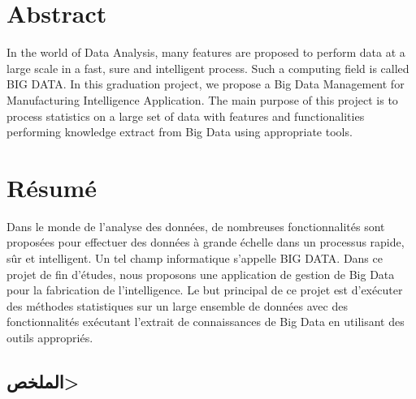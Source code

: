 \renewcommand{\abstractnamefont}{\normalfont\Large\bfseries}


\hskip7mm






\section*{Abstract}


\begin{spacing}{1.3}
In the world of Data Analysis, many features are proposed to perform data at a large scale in a fast, sure and intelligent process. Such a computing field is called BIG DATA. In this graduation project, we propose a Big Data Management for Manufacturing Intelligence Application. The main purpose of this project is to process statistics on a large set of data with features and functionalities performing knowledge extract from Big Data using appropriate tools.\\
\end{spacing}





\section*{Résumé}


\begin{spacing}{1.3}
Dans le monde de l'analyse des données, de nombreuses fonctionnalités sont proposées pour effectuer des données à grande échelle dans un processus rapide, sûr et intelligent. Un tel champ informatique s'appelle BIG DATA. Dans ce projet de fin d'études, nous proposons une application de gestion de Big Data pour la fabrication de l'intelligence. Le but principal de ce projet est d'exécuter des méthodes statistiques sur un large ensemble de données avec des fonctionnalités exécutant l'extrait de connaissances de Big Data en utilisant des outils appropriés.\\
\end{spacing}

\begin{flushright}
\section*{\<الملخص>}
\end{flushright}


